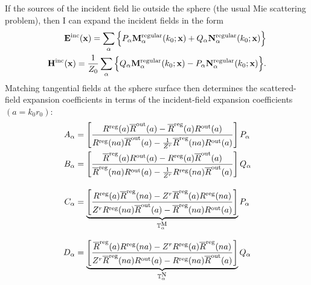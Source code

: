\documentclass[letterpaper]{article}
\newcommand{\RBar}{\overline{R}}
\begin{document}
If the sources of the incident field lie outside the sphere
(the usual Mie scattering problem),
then I can expand the incident fields in the form
\begin{subequations}
\begin{align}
  \mathbf{E}^{\text{\scriptsize inc}}(\mathbf{x}) =
   \sum_{\alpha}
    \Big\{
        P_\alpha \mathbf{M}^{\text{\scriptsize regular}}_\alpha(k_0; \mathbf{x})
       +Q_\alpha \mathbf{N}^{\text{\scriptsize regular}}_\alpha(k_0; \mathbf{x})
    \Big\}
\\
  \mathbf{H}^{\text{\scriptsize inc}}(\mathbf{x}) =
   \frac{1}{Z_0}
   \sum_{\alpha}
    \Big\{
        Q_\alpha \mathbf{M}^{\text{\scriptsize regular}}_\alpha(k_0; \mathbf{x})
       -P_\alpha \mathbf{N}^{\text{\scriptsize regular}}_\alpha(k_0; \mathbf{x})
    \Big\}.
\end{align}
\label{EHIncOutsideExpansion} %
\end{subequations}
Matching tangential fields at the sphere surface then 
determines
the scattered-field expansion coefficients in terms of the 
incident-field expansion coefficients $(a=k_0 r_0)$:
\begin{subequations}
\begin{align}
 A_\alpha 
 &= \left[\frac{  R\sups{reg}(a) \RBar\sups{out}(a)
                -\RBar\sups{reg}(a) R\sups{out}(a)
         }
         {
            R\sups{reg}(n a) \RBar\sups{out}(a) 
           -\frac{1}{Z^r} \RBar\sups{reg}(n a) R\sups{out}(a)
          }
    \right]P_\alpha
\\
 B_\alpha 
 &= \left[\frac{  \RBar\sups{reg}(a) R\sups{out}(a) 
                -R\sups{reg}(a) \RBar\sups{out}(a)
         }
         {
            \RBar\sups{reg}(n a) R\sups{out}(a) 
           -\frac{1}{Z^r} R\sups{reg}(n a) \RBar\sups{out}(a)
          }
    \right]Q_\alpha
\\[10pt]
 C_\alpha 
 &=\underbrace{ 
    \left[\frac{      R\sups{reg}(a) \RBar\sups{reg}(n a)
                 -Z^r \RBar\sups{reg}(a) R\sups{reg}(n a)
               }
         {
            Z^r R\sups{reg}(n a) \RBar\sups{out}(a) 
           -    \RBar\sups{reg}(n a) R\sups{out}(a)
          }
    \right] }_{\mb T_{\alpha}\supt{M}}
          P_\alpha
\\[8pt]
 D_\alpha 
 &= \underbrace{
    \left[\frac{     \RBar\sups{reg}(a) R\sups{reg}(na) 
                 -Z^r R\sups{reg}(a) \RBar\sups{reg}(na)
         }
         {
            Z^r \RBar\sups{reg}(n a) R\sups{out}(a) 
           - R\sups{reg}(n a) \RBar\sups{out}(a)
          }
    \right]
              }_{\mb T_{\alpha}\supt{N}}
          Q_\alpha
\end{align}
\label{ABCDOutside}%
\end{subequations}
\end{document}
